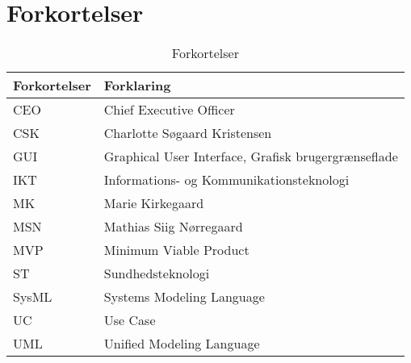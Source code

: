 \chapter{Forkortelser}
\begin{table}[h]
\centering
\begin{tabular}{|l| p{}|}
\hline
\textbf{Forkortelser} &  \textbf{Forklaring} \\\hline
CEO & Chief Executive Officer \\\hline
CSK & Charlotte Søgaard Kristensen \\\hline
GUI & Graphical User Interface, Grafisk brugergrænseflade \\\hline
IKT & Informations- og Kommunikationsteknologi \\\hline
MK & Marie Kirkegaard \\\hline
MSN & Mathias Siig Nørregaard \\\hline
MVP & Minimum Viable Product  \\\hline
ST  & Sundhedsteknologi \\\hline
SysML & Systems Modeling Language\\\hline
UC  & Use Case \\\hline
UML & Unified Modeling Language \\\hline
\end{tabular}
\caption{Forkortelser}
\end{table}

\vspace{5cm}